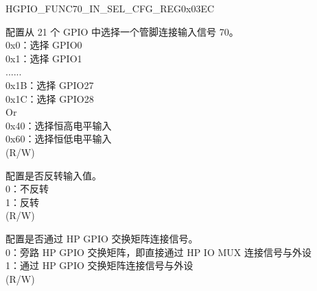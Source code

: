 \begin{register}{H}{GPIO\_FUNC70\_IN\_SEL\_CFG\_REG}{0x03EC}\label{regdesc:GPIOFUNC70INSELCFGREG}
%
%
%
%
\regnewline%
\begin{regdesc}\begin{reglist}
\label{fielddesc:GPIOFUNC70INSEL}\item [GPIO\_FUNC70\_IN\_SEL] 配置从 21 个 GPIO 中选择一个管脚连接输入信号 70。\\
0x0：选择 GPIO0\\
0x1：选择 GPIO1\\
......\\
0x1B：选择 GPIO27\\
0x1C：选择 GPIO28\\
Or\\
0x40：选择恒高电平输入\\
0x60：选择恒低电平输入\\ (R/W)
\label{fielddesc:GPIOFUNC70ININVSEL}\item [GPIO\_FUNC70\_IN\_INV\_SEL] 配置是否反转输入值。\\
0：不反转\\
1：反转\\ (R/W)
\label{fielddesc:GPIOSIG70INSEL}\item [GPIO\_SIG70\_IN\_SEL] 配置是否通过 HP GPIO 交换矩阵连接信号。\\
0：旁路 HP GPIO 交换矩阵，即直接通过 HP IO MUX 连接信号与外设\\
1：通过 HP GPIO 交换矩阵连接信号与外设\\
 (R/W)
\end{reglist}\end{regdesc}
\end{register}


